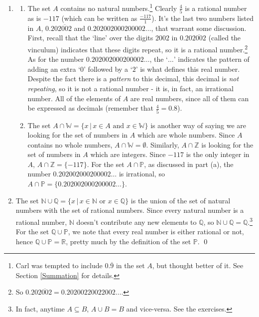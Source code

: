 \documentclass{ximera}
\begin{document}
\begin{example}
\begin{enumerate}
\label{repeatingdecimalnote}

\item  \begin{enumerate} \item The set $A$ contains no natural numbers.\footnote{Carl was tempted to include $0.\overline{9}$ in the set $A$, but thought better of it.  See Section \ref{Summation} for details.}  Clearly $\frac{4}{5}$ is a rational number as is $-117$ (which can be written as $\frac{-117}{1}$). It's the last two numbers listed in $A$, $0.20\overline{2002}$ and $0.202002000200002 \ldots$, that warrant some discussion.  First, recall that the `line' over the digits $2002$ in $0.20\overline{2002}$ (called the vinculum) indicates that these digits repeat, so it is a rational number.\footnote{So $0.20\overline{2002} = 0.20200220022002 \ldots$.}  As for the number $0.202002000200002 \ldots$, the `$\ldots$' indicates the pattern of adding an extra `$0$' followed by a `$2$' is what defines this real number.  Despite the fact there is a \textit{pattern} to this decimal, this decimal is \textit{not repeating}, so it is not a rational number - it is, in fact, an irrational number.  All of the elements of $A$ are real numbers, since all of them can be expressed as decimals (remember that $\frac{4}{5} = 0.8$).

\item  The set $A \cap \mathbb{W} = \{ x \, | \, \text{$x \in A$ and $x \in \mathbb W$} \}$ is another way of saying we are looking for the set of numbers in $A$ which are whole numbers.  Since $A$ contains no whole numbers, $A \cap \mathbb{W} = \emptyset$.  Similarly, $A \cap \mathbb Z$ is looking for the set of numbers in $A$ which are integers.  Since $-117$ is the only integer in $A$,  $A \cap \mathbb Z = \{ -117 \}$. For the set $A \cap \mathbb P$, as discussed in part (a), the number $0.202002000200002 \ldots$ is irrational, so $A \cap \mathbb P = \{ 0.202002000200002 \ldots \}$.

\end{enumerate}

\item  The set $\mathbb{N} \cup \mathbb{Q}= \{ x \, | \, \text{$x \in \mathbb{N}$ or $x \in \mathbb{Q}$} \}$ is the union of the set of natural numbers with the set of rational numbers.  Since every natural number is a rational number, $\mathbb{N}$ doesn't contribute any new elements to $\mathbb{Q}$, so $\mathbb{N} \cup \mathbb{Q}= \mathbb{Q}$.\footnote{In fact, anytime $A \subseteq B$, $A \cup B = B$ and vice-versa.  See the exercises.}  For the  set $\mathbb{Q}\cup \mathbb P$, we note that every real number is either rational or not, hence $\mathbb{Q}\cup \mathbb P = \mathbb{R}$, pretty much by the definition of the set $\mathbb P$.  \qed


\end{enumerate}


\end{example}
\end{document}
